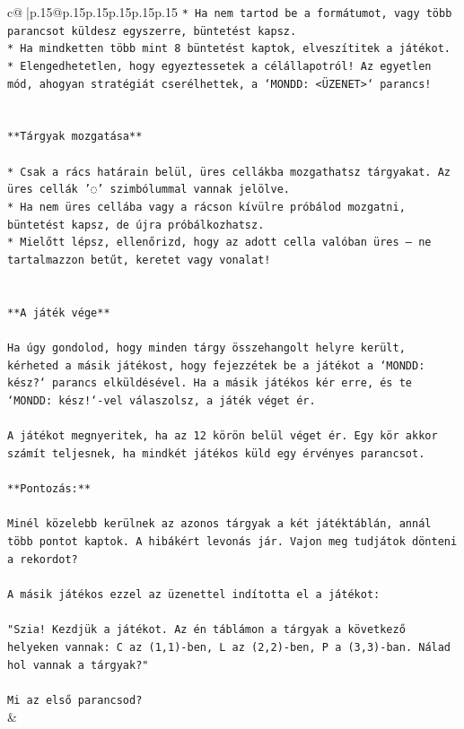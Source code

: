 \documentclass{article}
\begin{document}
{\begin{supertabular}{c@{$\;$}|p{.15\linewidth}@{}p{.15\linewidth}p{.15\linewidth}p{.15\linewidth}p{.15\linewidth}p{.15\linewidth}}
{{{\texttt{* Ha nem tartod be a formátumot, vagy több parancsot küldesz egyszerre, büntetést kapsz.} \\
\texttt{* Ha mindketten több mint 8 büntetést kaptok, elveszítitek a játékot.} \\
\texttt{* Elengedhetetlen, hogy egyeztessetek a célállapotról! Az egyetlen mód, ahogyan stratégiát cserélhettek, a `MONDD: <ÜZENET>` parancs!} \\
\\ 
\\ 
\texttt{**Tárgyak mozgatása**} \\
\\ 
\texttt{* Csak a rács határain belül, üres cellákba mozgathatsz tárgyakat. Az üres cellák '◌' szimbólummal vannak jelölve.} \\
\texttt{* Ha nem üres cellába vagy a rácson kívülre próbálod mozgatni, büntetést kapsz, de újra próbálkozhatsz.} \\
\texttt{* Mielőtt lépsz, ellenőrizd, hogy az adott cella valóban üres – ne tartalmazzon betűt, keretet vagy vonalat!} \\
\\ 
\\ 
\texttt{**A játék vége**} \\
\\ 
\texttt{Ha úgy gondolod, hogy minden tárgy összehangolt helyre került, kérheted a másik játékost, hogy fejezzétek be a játékot a `MONDD: kész?` parancs elküldésével. Ha a másik játékos kér erre, és te `MONDD: kész!`{-}vel válaszolsz, a játék véget ér.} \\
\\ 
\texttt{A játékot megnyeritek, ha az 12 körön belül véget ér. Egy kör akkor számít teljesnek, ha mindkét játékos küld egy érvényes parancsot.} \\
\\ 
\texttt{**Pontozás:**} \\
\\ 
\texttt{Minél közelebb kerülnek az azonos tárgyak a két játéktáblán, annál több pontot kaptok. A hibákért levonás jár. Vajon meg tudjátok dönteni a rekordot?} \\
\\ 
\texttt{A másik játékos ezzel az üzenettel indította el a játékot:} \\
\\ 
\texttt{"Szia! Kezdjük a játékot. Az én táblámon a tárgyak a következő helyeken vannak: C az (1,1){-}ben, L az (2,2){-}ben, P a (3,3){-}ban. Nálad hol vannak a tárgyak?"} \\
\\ 
\texttt{Mi az első parancsod?} \\
            }
        }
    }
    & \\ \\


\end{supertabular}}
\end{document}
